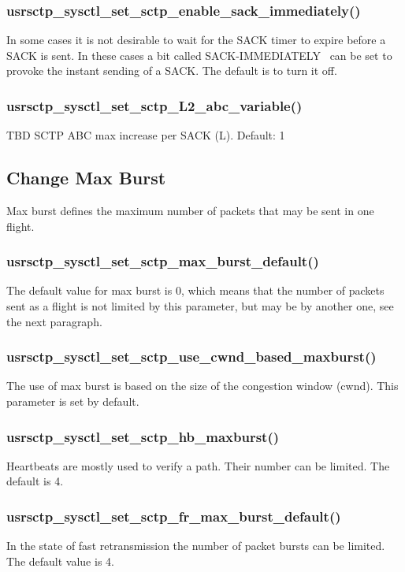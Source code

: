 \documentclass[a4paper]{article}
\begin{document}
\subsubsection{usrsctp\_sysctl\_set\_sctp\_enable\_sack\_immediately()}
In some cases it is not desirable to wait for the SACK timer to expire before a SACK is sent. In these
cases a bit called SACK-IMMEDIATELY~\cite{sack-imm} can be set to provoke the instant sending of a SACK. 
The default is to turn it off. 

\subsubsection{usrsctp\_sysctl\_set\_sctp\_L2\_abc\_variable()}
TBD
SCTP ABC max increase per SACK (L). Default: 1

\subsection{Change Max Burst}
Max burst defines the maximum number of packets that may be sent in one flight.

\subsubsection{usrsctp\_sysctl\_set\_sctp\_max\_burst\_default()}
The default value for max burst is 0, which means that the number of packets sent as a flight
is not limited by this parameter, but may be by another one, see the next paragraph.

\subsubsection{usrsctp\_sysctl\_set\_sctp\_use\_cwnd\_based\_maxburst()}
The use of max burst is based on the size of the congestion window (cwnd). 
This parameter is set by default.

\subsubsection{usrsctp\_sysctl\_set\_sctp\_hb\_maxburst()}
Heartbeats are mostly used to verify a path. Their number can be limited. The default is 4.

\subsubsection{usrsctp\_sysctl\_set\_sctp\_fr\_max\_burst\_default()}
In the state of fast retransmission the number of packet bursts can be limited. The default
value is 4.
\end{document}
